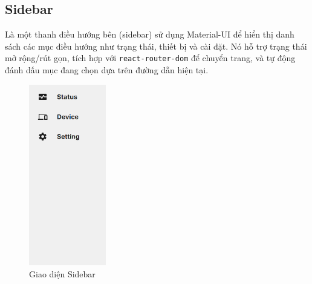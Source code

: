         \subsection{Sidebar}
            \hspace*{0.6cm}Là một thanh điều hướng bên (sidebar) sử dụng Material-UI để hiển thị danh sách các mục điều hướng như trạng thái, thiết bị và cài đặt. Nó hỗ trợ trạng thái mở rộng/rút gọn, tích hợp với \texttt{react-router-dom} để chuyển trang, và tự động đánh dấu mục đang chọn dựa trên đường dẫn hiện tại.
            \begin{figure}[H]
                \centering
                \includegraphics[width=0.3\textwidth]{pictures/Sidebar.png}
                \caption{Giao diện Sidebar}
                \label{fig:sidebar}
            \end{figure}
